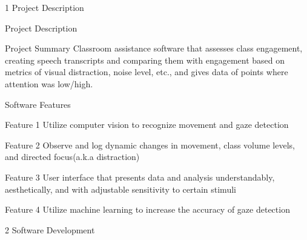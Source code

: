 \documentclass[12pt]{article}
\begin{document}
\begin{flushleft} \large
1   Project Description 
\end{flushleft}
\begin{sectionbox}[colback=white]{Project Description}
\begin{subsectionbox}[colback=white]{Project Summary}
Classroom assistance software that assesses class engagement, creating speech
transcripts and comparing them with engagement based on metrics of visual distraction, noise level, etc., and gives data of points where attention was low/high.
\end{subsectionbox}

\begin{subsectionbox}[colback=white]{Software Features}
\begin{featurebox}[colback=white]{Feature 1}
Utilize computer vision to recognize movement and gaze detection
\end{featurebox}
\begin{featurebox}[colback=white]{Feature 2}
Observe and log dynamic changes in movement, class volume levels, and directed focus(a.k.a distraction)
\end{featurebox}
\begin{featurebox}[colback=white]{Feature 3}
User interface that presents data and analysis understandably, aesthetically, and with adjustable sensitivity to certain stimuli
\end{featurebox}
\begin{featurebox}[colback=white]{Feature 4}
Utilize machine learning to increase the accuracy of gaze detection
\end{featurebox}
\end{subsectionbox}
\end{sectionbox}
\newpage
\begin{flushleft} \large
2    Software Development
\end{flushleft}
\end{document}
